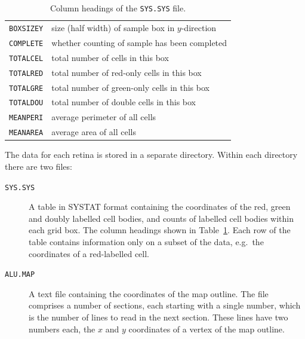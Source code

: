 \documentclass{article}
\begin{document}
\begin{table}
\begin{tabular}{ll}
    \texttt{BOXSIZEY} & size (half width) of sample box in $y$-direction \\
    \texttt{COMPLETE} & whether counting of sample has been completed\\
    \texttt{TOTALCEL} & total number of cells in this box\\
    \texttt{TOTALRED} & total number of red-only cells in this box\\
    \texttt{TOTALGRE} & total number of green-only cells in this box\\
    \texttt{TOTALDOU} & total number of double cells in this box\\
    \texttt{MEANPERI} & average perimeter of all cells \\
    \texttt{MEANAREA} & average area of all cells \\
  \end{tabular}
  \caption{Column headings of the \texttt{SYS.SYS} file.}
  \label{tab:data-format}
\end{table}

The data for each retina is stored in a separate directory. Within
each directory there are two files:
\begin{description}
\item[\texttt{SYS.SYS}] A table in SYSTAT format containing the
  coordinates of the red, green and doubly labelled cell bodies, and
  counts of labelled cell bodies within each grid box. The column
  headings shown in Table~\ref{tab:data-format}.  Each row of the
  table contains information only on a subset of the data, e.g.\ the
  coordinates of a red-labelled cell.
\item[\texttt{ALU.MAP}] A text file containing the coordinates of the
  map outline. The file comprises a number of sections, each starting
  with a single number, which is the number of lines to read in the
  next section. These lines have two numbers each, the $x$ and $y$
  coordinates of a vertex of the map outline.
\end{description}



\end{document}
